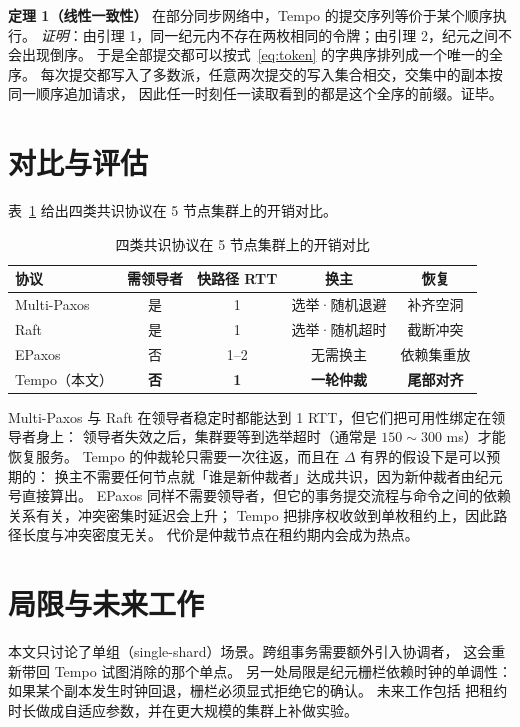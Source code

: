 \documentclass[12pt]{ctexart}
\begin{document}
\textbf{定理 1（线性一致性）} 在部分同步网络中，Tempo 的提交序列等价于某个顺序执行。
\emph{证明}：由引理 1，同一纪元内不存在两枚相同的令牌；由引理 2，纪元之间不会出现倒序。
于是全部提交都可以按式~\eqref{eq:token} 的字典序排列成一个唯一的全序。
每次提交都写入了多数派，任意两次提交的写入集合相交，交集中的副本按同一顺序追加请求，
因此任一时刻任一读取看到的都是这个全序的前缀。证毕。

\section{对比与评估}\label{sec:eval}
表~\ref{tab:cmp} 给出四类共识协议在 5 节点集群上的开销对比。
\begin{table}[htbp]
  \centering
  \caption{四类共识协议在 5 节点集群上的开销对比}\label{tab:cmp}
  \small
  \begin{tabular}{lcccc}
    \hline
    协议 & 需领导者 & 快路径 RTT & 换主 & 恢复 \\
    \hline
    Multi-Paxos & 是 & 1 & 选举·随机退避 & 补齐空洞 \\
    Raft & 是 & 1 & 选举·随机超时 & 截断冲突 \\
    EPaxos & 否 & 1--2 & 无需换主 & 依赖集重放 \\
    Tempo（本文） & \textbf{否} & \textbf{1} & \textbf{一轮仲裁} & \textbf{尾部对齐} \\
    \hline
  \end{tabular}
\end{table}

Multi-Paxos 与 Raft 在领导者稳定时都能达到 1 RTT，但它们把可用性绑定在领导者身上：
领导者失效之后，集群要等到选举超时（通常是 $150\sim 300$ ms）才能恢复服务。
Tempo 的仲裁轮只需要一次往返，而且在 $\Delta$ 有界的假设下是可以预期的：
换主不需要任何节点就「谁是新仲裁者」达成共识，因为新仲裁者由纪元号直接算出。
EPaxos 同样不需要领导者，但它的事务提交流程与命令之间的依赖关系有关，冲突密集时延迟会上升；
Tempo 把排序权收敛到单枚租约上，因此路径长度与冲突密度无关。
代价是仲裁节点在租约期内会成为热点。

\section{局限与未来工作}
本文只讨论了单组（single-shard）场景。跨组事务需要额外引入协调者，
这会重新带回 Tempo 试图消除的那个单点。
另一处局限是纪元栅栏依赖时钟的单调性：如果某个副本发生时钟回退，栅栏必须显式拒绝它的确认。
未来工作包括 %
把租约时长做成自适应参数，并在更大规模的集群上补做实验。
\end{document}
